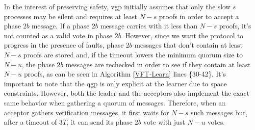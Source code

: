 In the interest of preserving safety, \acrshort{vgp} initially assumes that only the slow $s$ processes may be silent and requires at least $N-s$ proofs in order to accept a phase $2b$ message. If a phase $2b$ message carries with it less than $N-s$ proofs, it's not counted as a valid vote in phase $2b$. However, since we want the protocol to progress in the presence of faults, phase $2b$ messages that don't contain at least $N-s$ proofs are stored and, if the timeout lowers the minimum quorum size to $N-u$, the phase $2b$ messages are rechecked in order to see if they contain at least $N-u$ proofs, as can be seen in Algorithm \ref{VFT-Learn} lines \{30-42\}. It's important to note that the \acrshort{qgp} is only explicit at the learner due to space constraints. However, both the leader and the acceptors also implement the exact same behavior when gathering a quorum of messages. Therefore, when an acceptor gathers verification messages, it first waits for $N-s$ such messages but, after a timeout of $3T$, it can send its phase $2b$ vote with just $N-u$ votes.\par

